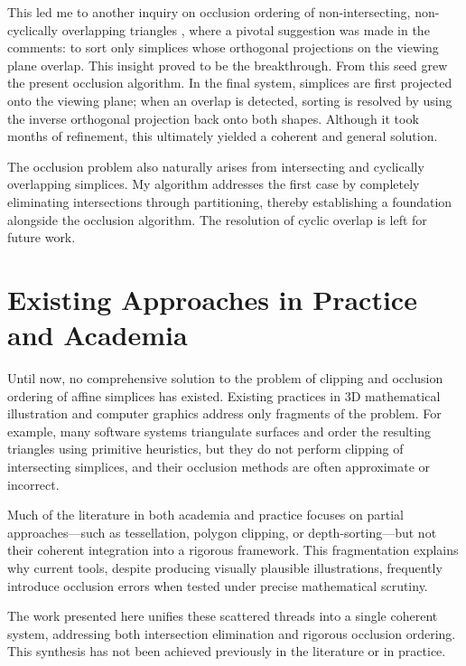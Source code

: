 This led me to another inquiry on occlusion ordering of
non-intersecting, non-cyclically overlapping triangles
\cite{5063772}, where a pivotal suggestion was made in the
comments: to sort only simplices whose orthogonal projections on
the viewing plane overlap. This insight proved to be the
breakthrough. From this seed grew the present occlusion algorithm.
In the final system, simplices are first projected onto the viewing
plane; when an overlap is detected, sorting is resolved by using
the inverse orthogonal projection back onto both shapes. Although
it took months of refinement, this ultimately yielded a coherent
and general solution.

The occlusion problem also naturally arises from intersecting and
cyclically overlapping simplices. My algorithm addresses the first
case by completely eliminating intersections through partitioning,
thereby establishing a foundation alongside the occlusion
algorithm. The resolution of cyclic overlap is left for future
work.

\section{Existing Approaches in Practice and Academia}

Until now, no comprehensive solution to the problem of clipping 
and occlusion ordering of affine simplices has existed. Existing 
practices in \(3\)D mathematical illustration and computer graphics 
address only fragments of the problem. For example, many software 
systems triangulate surfaces and order the resulting triangles 
using primitive heuristics, but they do not perform clipping of 
intersecting simplices, and their occlusion methods are often 
approximate or incorrect. 

Much of the literature in both academia and practice focuses on 
partial approaches---such as tessellation, polygon clipping, or 
depth-sorting---but not their coherent integration into a rigorous 
framework. This fragmentation explains why current tools, despite 
producing visually plausible illustrations, frequently introduce 
occlusion errors when tested under precise mathematical scrutiny. 

The work presented here unifies these scattered threads into a 
single coherent system, addressing both intersection elimination 
and rigorous occlusion ordering. This synthesis has not been 
achieved previously in the literature or in practice.

